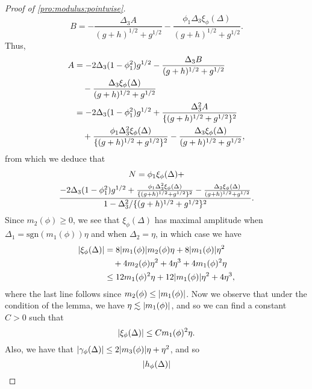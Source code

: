 \documentclass[journal]{IEEEtran}
\newcommand{\sgn}{\mathrm{sgn}}
\newcommand{\1}{\boldsymbol{1}}
\DeclarePairedDelimiter{\braces}{\{}{\}}
\DeclarePairedDelimiter{\abs}{\lvert}{\rvert}
\begin{document}
\begin{proof}[Proof of \cref{pro:modulus:pointwise}]
\begin{equation*}
          B%
          =- \frac{\Delta_3 A}{(g+h)^{1/2} + g^{1/2}}%
		- \frac{\phi_1\Delta_3 \xi_{\phi}(\Delta)}{(g+h)^{1/2} + g^{1/2}}.
        \end{equation*}
	Thus,
	\begin{align*}
		A%
		&= -2\Delta_3(1-\phi_1^2)g^{1/2}%
                  - \frac{\Delta_3 B}{(g+h)^{1/2} + g^{1/2}}\\%
          &\quad
		- \frac{\Delta_3 \xi_{\phi}(\Delta)}{(g+h)^{1/2} + g^{1/2}}\\
		&= -2\Delta_3(1-\phi_1^2)g^{1/2}%
                  + \frac{\Delta_3^2 A}{ \braces{(g+h)^{1/2}+g^{1/2}}^2 }\\%
          &\quad%
                  + \frac{\phi_1 \Delta_3^2 \xi_{\phi}(\Delta)}{\{(g+h)^{1/2} + g^{1/2}\}^2 }%
		- \frac{\Delta_3 \xi_{\phi}(\Delta)}{(g+h)^{1/2} + g^{1/2}},
	\end{align*}
	from which we deduce that
	\begin{multline*}
		N%
		= \phi_1\xi_{\phi}(\Delta)+ \\%
		\frac{-2\Delta_3(1-\phi_1^2)g^{1/2} + \frac{\phi_1 \Delta_3^2 \xi_{\phi}(\Delta)}{\braces{(g+h)^{1/2} + g^{1/2}}^2 }%
			- \frac{\Delta_3 \xi_{\phi}(\Delta)}{(g+h)^{1/2} + g^{1/2}} }{1 - \Delta_3^2/\braces{(g+h)^{1/2} + g^{1/2}}^2 }.
	\end{multline*}
	Since
	$m_2(\phi) \geq 0$, we see that $\xi_{\phi}(\Delta)$ has maximal amplitude when
	$\Delta_1 = \sgn(m_1(\phi))\eta$ and when $\Delta_2 = \eta$, in which case we have
	\begin{align*}
		\abs{\xi_{\phi}(\Delta)}%
          &= 8\abs{m_1(\phi)}m_2(\phi)\eta + 8\abs{m_1(\phi)}\eta^2\\
          &\quad+ 4 m_2(\phi)\eta^2 + 4\eta^3 + 4m_1(\phi)^2\eta\\
		&\leq 12 m_1(\phi)^2 \eta + 12 \abs{m_1(\phi)} \eta^2 + 4\eta^3,
	\end{align*}
	where the last line follows since $m_2(\phi) \leq \abs{m_1(\phi)}$. Now we observe that under
	the condition of the lemma, we have $\eta \lesssim \abs{m_1(\phi)}$, and so we can find a
	constant $C > 0$ such that
	\begin{equation*}
		\abs{\xi_{\phi}(\Delta)}%
		\leq C m_1(\phi)^2 \eta.
	\end{equation*}
	Also, we have that $\abs{\gamma_{\phi}(\Delta)} \leq 2\abs{m_3(\phi)}\eta + \eta^2$, and so
	\begin{equation*}
		\abs{h_{\phi}(\Delta)}%

\end{equation*}
\end{proof}
\end{document}
